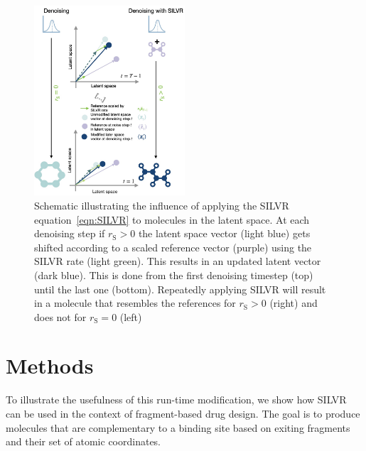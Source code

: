 \documentclass[journal=jacsat,manuscript=article]{achemso}
\begin{document}
\begin{figure}
    \centering
    \includegraphics[width=0.5\textwidth]{paper/Figures/Fig2/fig2.jpg}
    \caption{Schematic illustrating the influence of applying the SILVR equation~\ref{eqn:SILVR} to molecules in the latent space. At each denoising step if $r_{\mathrm{S}}>0$ the latent space vector (light blue) gets shifted according to a scaled reference vector (purple) using the SILVR rate (light green). This results in an updated latent vector (dark blue). This is done from the first denoising timestep (top) until the last one (bottom). Repeatedly applying SILVR will result in a molecule that resembles the references for $r_{\mathrm{S}}>0$ (right) and does not for $r_{\mathrm{S}}=0$ (left)}
    \label{fig:silvr_explanation}
\end{figure}

\section{Methods}
To illustrate the usefulness of this run-time modification, we show how SILVR can be used in the context of fragment-based drug design. The goal is to produce molecules that are complementary to a binding site based on exiting fragments and their set of atomic coordinates. 
\end{document}
